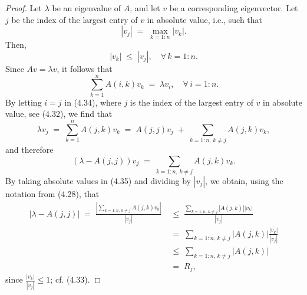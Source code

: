 %

\begin{proof}
Let $\lambda$ be an eigenvalue of $A$, and let $v$ be a corresponding eigenvector. Let
$j$ be the index of the largest entry of $v$ in absolute value, i.e., such that
\begin{equation}
|v_j| \;=\; \max_{k=1:n} |v_k|.
\end{equation}
Then,
\begin{equation}
|v_k| \;\leq\; |v_j|, \quad \forall\, k = 1:n.
\end{equation}
Since $Av = \lambda v$, it follows that
\begin{equation}
\sum_{k=1}^n A(i,k) v_k \;=\; \lambda v_i, \quad \forall\, i = 1:n.
\end{equation}
By letting $i = j$ in (4.34), where $j$ is the index of the largest entry of $v$ in
absolute value, see (4.32), we find that
\[
\lambda v_j \;=\; \sum_{k=1}^n A(j,k)v_k \;=\; A(j,j)v_j \;+\; \sum_{k=1:n,\, k \neq j}
A(j,k)v_k,
\]
and therefore
\begin{equation}
(\lambda - A(j,j))v_j \;=\; \sum_{k=1:n,\, k \neq j} A(j,k)v_k.
\end{equation}
By taking absolute values in (4.35) and dividing by $|v_j|$, we obtain, using the
notation from (4.28), that
\begin{align*}
|\lambda - A(j,j)| \;=\; \frac{\left|\sum_{k=1:n,\, k \neq j} A(j,k)v_k\right|}{|v_j|}
&\;\leq\; \frac{\sum_{k=1:n,\, k \neq j} |A(j,k)||v_k|}{|v_j|}\\
&\;=\; \sum_{k=1:n,\, k \neq j} |A(j,k)| \frac{|v_k|}{|v_j|}\\
&\;\leq\; \sum_{k=1:n,\, k \neq j} |A(j,k)|\\
&\;=\; R_j,
\end{align*}
since $\frac{|v_k|}{|v_j|} \leq 1$; cf. (4.33).
\end{proof}

